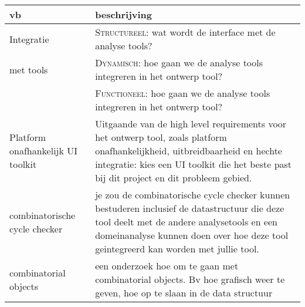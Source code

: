 \begin{center}
    \begin{tabular}{|p{2.5cm}|p{10cm}|}
    \hline
        {\bf vb}		& {\bf beschrijving} \\\hline
        Integratie		& \textsc{Structureel}: wat wordt de interface met de analyse tools? \\
	met tools 		& \textsc{Dynamisch}: hoe gaan we de analyse tools integreren in het ontwerp tool?\\
				& \textsc{Functioneel}: hoe gaan we de analyse tools integreren in het ontwerp tool?\\\hline
        Platform onafhankelijk UI toolkit & Uitgaande van de high level requirements voor het ontwerp
					    tool, zoals platform onafhankelijkheid, uitbreidbaarheid
					    en hechte integratie: kies een UI toolkit die het
					    beste past bij dit project en dit probleem gebied.\\\hline
        combinatorische cycle checker & je zou de combinatorische cycle checker kunnen bestuderen inclusief de datastructuur die
					deze tool deelt met de andere analysetools en een domeinanalyse kunnen doen
					over hoe deze tool geintegreerd kan worden met jullie tool.\\\hline
         combinatorial objects &  een onderzoek hoe om te gaan met combinatorial objects.
				    Bv hoe grafisch weer te geven, hoe op te slaan in de data structuur\\\hline
    \end{tabular}

\end{center}
